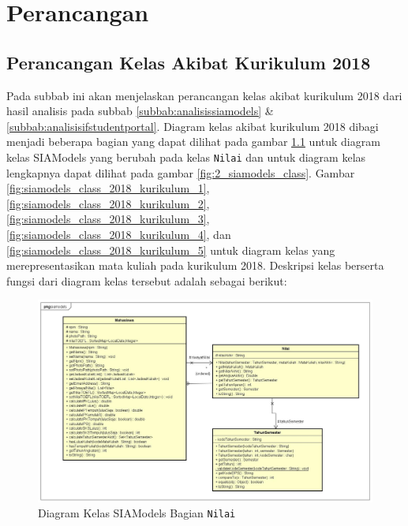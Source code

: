 \chapter{Perancangan}
\label{chap:perancangan}

\section{Perancangan Kelas Akibat Kurikulum 2018}

Pada subbab ini akan menjelaskan perancangan kelas akibat kurikulum 2018 dari hasil analisis pada subbab \ref{subbab:analisissiamodels} \& \ref{subbab:analisisifstudentportal}. Diagram kelas akibat kurikulum 2018 dibagi menjadi beberapa bagian yang dapat dilihat pada gambar \ref{fig:siamodels_class_2018} untuk diagram kelas SIAModels yang berubah pada kelas \texttt{Nilai} dan untuk diagram kelas lengkapnya dapat dilihat pada gambar \ref{fig:2_siamodels_class}. Gambar \ref{fig:siamodels_class_2018_kurikulum_1}, \ref{fig:siamodels_class_2018_kurikulum_2}, \ref{fig:siamodels_class_2018_kurikulum_3}, \ref{fig:siamodels_class_2018_kurikulum_4}, dan \ref{fig:siamodels_class_2018_kurikulum_5} untuk diagram kelas yang merepresentasikan mata kuliah pada kurikulum 2018. Deskripsi kelas berserta fungsi dari diagram kelas tersebut adalah sebagai berikut:

\begin{figure}[H]
\centering
\includegraphics[scale=0.3]{Gambar/class-diagram-siamodels-new}
\caption{Diagram Kelas SIAModels Bagian \texttt{Nilai}}
\label{fig:siamodels_class_2018}
\end{figure}

